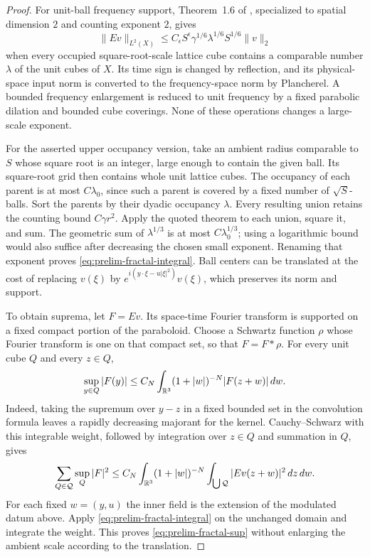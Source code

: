 \begin{proof}
For unit-ball frequency support, Theorem~1.6 of \cite{DZ19}, specialized to
spatial dimension $2$ and counting exponent $2$, gives
\[
 \|Ev\|_{L^2(X)}
 \leq C_\epsilon S^\epsilon
       \gamma^{1/6}\lambda^{1/6}S^{1/6}\|v\|_2
\]
when every occupied square-root-scale lattice cube contains a comparable
number $\lambda$ of the unit cubes of $X$.  Its time sign is changed by
reflection, and its physical-space input norm is converted to the
frequency-space norm by Plancherel.  A bounded frequency enlargement is
reduced to unit frequency by a fixed parabolic dilation and bounded cube
coverings.  None of these operations changes a large-scale exponent.

For the asserted upper occupancy version, take an ambient radius comparable
to $S$ whose square root is an integer, large enough to contain the given
ball.  Its square-root grid then contains whole unit lattice cubes.  The
occupancy of each parent is at most $C\lambda_0$, since such a parent is
covered by a fixed number of $\sqrt S$-balls.  Sort the parents by their
dyadic occupancy $\lambda$.  Every resulting union retains the counting
bound $C\gamma r^2$.  Apply the quoted theorem to each union, square it,
and sum.  The geometric sum of $\lambda^{1/3}$ is at most
$C\lambda_0^{1/3}$; using a logarithmic bound would also suffice after
decreasing the chosen small exponent.  Renaming that exponent proves
\eqref{eq:prelim-fractal-integral}.  Ball centers can be translated at the
cost of replacing $v(\xi)$ by
$e^{i(y\cdot\xi-u|\xi|^2)}v(\xi)$, which preserves its norm and support.

To obtain suprema, let $F=Ev$.  Its space-time Fourier transform is supported
on a fixed compact portion of the paraboloid.  Choose a Schwartz function
$\rho$ whose Fourier transform is one on that compact set, so that
$F=F*\rho$.  For every unit cube $Q$ and every $z\in Q$,
\begin{equation}
 \sup_{y\in Q}|F(y)|
 \leq C_N\int_{\mathbb R^3}(1+|w|)^{-N}|F(z+w)|\,dw.
 \label{eq:prelim-reproducing}
\end{equation}
Indeed, taking the supremum over $y-z$ in a fixed bounded set in the
convolution formula leaves a rapidly decreasing majorant for the kernel.
Cauchy--Schwarz with this integrable weight, followed by integration over
$z\in Q$ and summation in $Q$, gives
\[
 \sum_{Q\in\mathcal Q}\sup_Q|F|^2
 \leq C_N\int_{\mathbb R^3}(1+|w|)^{-N}
       \int_{\bigcup\mathcal Q}|Ev(z+w)|^2\,dz\,dw.
\]
For each fixed $w=(y,u)$ the inner field is the extension of the modulated
datum above.  Apply \eqref{eq:prelim-fractal-integral} on the unchanged
domain and integrate the weight.  This proves
\eqref{eq:prelim-fractal-sup} without enlarging the ambient scale according
to the translation.
\end{proof}

